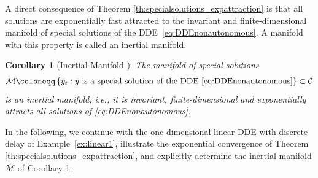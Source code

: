 \documentclass[10pt]{article}
\numberwithin{equation}{section}
\newtheorem{corollary}[theorem]{Corollary}
\begin{document}
	
	A direct consequence of Theorem \ref{th:specialsolutions_expattraction} is that all solutions are exponentially fast attracted to the invariant and finite-dimensional manifold of special solutions of the DDE~\eqref{eq:DDEnonautonomous}. A manifold with this property is called an inertial manifold. 
	
	
	\begin{corollary}[Inertial Manifold \cite{Chicone2003}] \label{cor:inertialmanifold}
		The manifold of special solutions 
		\begin{equation*}
			\mathcal{M} \coloneqq \left\{ \bar{y}_t : \bar{y} \textup{ is a special solution of the DDE \eqref{eq:DDEnonautonomous}} \right\} \subset \mathcal{C}
		\end{equation*}
		is an inertial manifold, i.e., it is invariant, finite-dimensional and exponentially attracts all solutions of \eqref{eq:DDEnonautonomous}.
	\end{corollary}
	
	In the following, we continue with the one-dimensional linear DDE with discrete delay of Example~\ref{ex:linear1}, illustrate the exponential convergence of Theorem \ref{th:specialsolutions_expattraction}, and explicitly determine the inertial manifold $\mathcal{M}$ of Corollary \ref{cor:inertialmanifold}.
	
\end{document}
